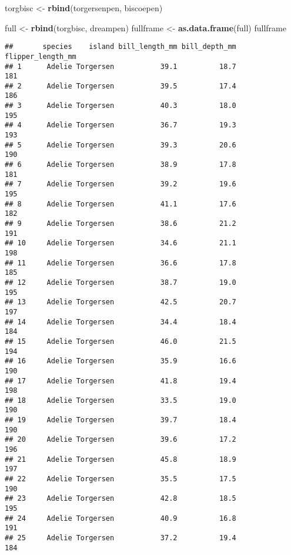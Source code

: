 \documentclass[
]{article}
\newenvironment{Shaded}{\begin{snugshade}}{\end{snugshade}}
\newcommand{\FunctionTok}[1]{\textcolor[rgb]{0.13,0.29,0.53}{\textbf{#1}}}
\newcommand{\NormalTok}[1]{#1}
\newcommand{\OtherTok}[1]{\textcolor[rgb]{0.56,0.35,0.01}{#1}}
\begin{document}
\begin{Shaded}
\begin{Highlighting}[]
\NormalTok{torgbisc }\OtherTok{\textless{}{-}} \FunctionTok{rbind}\NormalTok{(torgersenpen, biscoepen)}

\NormalTok{full }\OtherTok{\textless{}{-}} \FunctionTok{rbind}\NormalTok{(torgbisc, dreampen)}
\NormalTok{fullframe }\OtherTok{\textless{}{-}} \FunctionTok{as.data.frame}\NormalTok{(full)}
\NormalTok{fullframe}
\end{Highlighting}
\end{Shaded}

\begin{verbatim}
##       species    island bill_length_mm bill_depth_mm flipper_length_mm
## 1      Adelie Torgersen           39.1          18.7               181
## 2      Adelie Torgersen           39.5          17.4               186
## 3      Adelie Torgersen           40.3          18.0               195
## 4      Adelie Torgersen           36.7          19.3               193
## 5      Adelie Torgersen           39.3          20.6               190
## 6      Adelie Torgersen           38.9          17.8               181
## 7      Adelie Torgersen           39.2          19.6               195
## 8      Adelie Torgersen           41.1          17.6               182
## 9      Adelie Torgersen           38.6          21.2               191
## 10     Adelie Torgersen           34.6          21.1               198
## 11     Adelie Torgersen           36.6          17.8               185
## 12     Adelie Torgersen           38.7          19.0               195
## 13     Adelie Torgersen           42.5          20.7               197
## 14     Adelie Torgersen           34.4          18.4               184
## 15     Adelie Torgersen           46.0          21.5               194
## 16     Adelie Torgersen           35.9          16.6               190
## 17     Adelie Torgersen           41.8          19.4               198
## 18     Adelie Torgersen           33.5          19.0               190
## 19     Adelie Torgersen           39.7          18.4               190
## 20     Adelie Torgersen           39.6          17.2               196
## 21     Adelie Torgersen           45.8          18.9               197
## 22     Adelie Torgersen           35.5          17.5               190
## 23     Adelie Torgersen           42.8          18.5               195
## 24     Adelie Torgersen           40.9          16.8               191
## 25     Adelie Torgersen           37.2          19.4               184

\end{verbatim}
\end{document}
